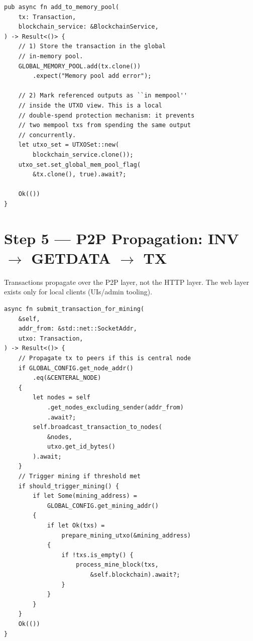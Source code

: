 \begin{listing}[htbp]
\caption{Mempool insert ()}
\label{lst:9-9-10}
\begin{verbatim}
pub async fn add_to_memory_pool(
    tx: Transaction,
    blockchain_service: &BlockchainService,
) -> Result<()> {
    // 1) Store the transaction in the global
    // in-memory pool.
    GLOBAL_MEMORY_POOL.add(tx.clone())
        .expect("Memory pool add error");

    // 2) Mark referenced outputs as ``in mempool''
    // inside the UTXO view. This is a local
    // double-spend protection mechanism: it prevents
    // two mempool txs from spending the same output
    // concurrently.
    let utxo_set = UTXOSet::new(
        blockchain_service.clone());
    utxo_set.set_global_mem_pool_flag(
        &tx.clone(), true).await?;

    Ok(())
}
\end{verbatim}
\end{listing}

\section{Step 5 --- P2P Propagation: INV \texorpdfstring{$\to$}{->} GETDATA \texorpdfstring{$\to$}{->} TX}
\label{sec:ch09-9-step5}

Transactions propagate over the P2P layer, not the HTTP layer. The web layer exists only for local clients (UIs/admin tooling).

\begin{listing}[htbp]
\caption{Background ``after accept'' hook ()}
\label{lst:9-9-11}
\begin{verbatim}
async fn submit_transaction_for_mining(
    &self,
    addr_from: &std::net::SocketAddr,
    utxo: Transaction,
) -> Result<()> {
    // Propagate tx to peers if this is central node
    if GLOBAL_CONFIG.get_node_addr()
        .eq(&CENTERAL_NODE)
    {
        let nodes = self
            .get_nodes_excluding_sender(addr_from)
            .await?;
        self.broadcast_transaction_to_nodes(
            &nodes,
            utxo.get_id_bytes()
        ).await;
    }
    // Trigger mining if threshold met
    if should_trigger_mining() {
        if let Some(mining_address) =
            GLOBAL_CONFIG.get_mining_addr()
        {
            if let Ok(txs) =
                prepare_mining_utxo(&mining_address)
            {
                if !txs.is_empty() {
                    process_mine_block(txs,
                        &self.blockchain).await?;
                }
            }
        }
    }
    Ok(())
}
\end{verbatim}
\end{listing}

